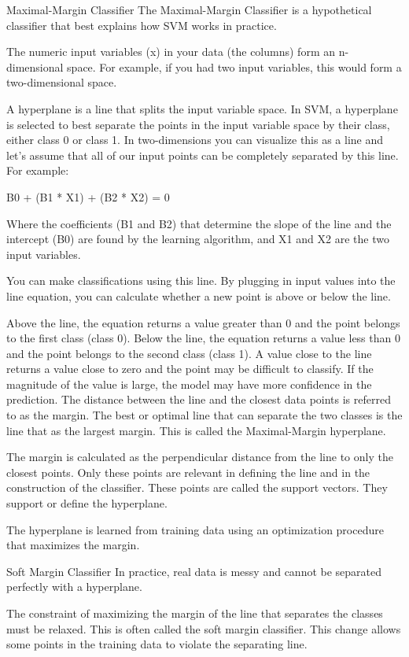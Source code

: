 \documentclass[12pt]{article}
\begin{document}
Maximal-Margin Classifier
The Maximal-Margin Classifier is a hypothetical classifier that best explains how SVM works in practice.

The numeric input variables (x) in your data (the columns) form an n-dimensional space. For example, if you had two input variables, this would form a two-dimensional space.

A hyperplane is a line that splits the input variable space. In SVM, a hyperplane is selected to best separate the points in the input variable space by their class, either class 0 or class 1. In two-dimensions you can visualize this as a line and let’s assume that all of our input points can be completely separated by this line. For example:

B0 + (B1 * X1) + (B2 * X2) = 0

Where the coefficients (B1 and B2) that determine the slope of the line and the intercept (B0) are found by the learning algorithm, and X1 and X2 are the two input variables.

You can make classifications using this line. By plugging in input values into the line equation, you can calculate whether a new point is above or below the line.

Above the line, the equation returns a value greater than 0 and the point belongs to the first class (class 0).
Below the line, the equation returns a value less than 0 and the point belongs to the second class (class 1).
A value close to the line returns a value close to zero and the point may be difficult to classify.
If the magnitude of the value is large, the model may have more confidence in the prediction.
The distance between the line and the closest data points is referred to as the margin. The best or optimal line that can separate the two classes is the line that as the largest margin. This is called the Maximal-Margin hyperplane.

The margin is calculated as the perpendicular distance from the line to only the closest points. Only these points are relevant in defining the line and in the construction of the classifier. These points are called the support vectors. They support or define the hyperplane.

The hyperplane is learned from training data using an optimization procedure that maximizes the margin.

Soft Margin Classifier
In practice, real data is messy and cannot be separated perfectly with a hyperplane.

The constraint of maximizing the margin of the line that separates the classes must be relaxed. This is often called the soft margin classifier. This change allows some points in the training data to violate the separating line.
\end{document}

